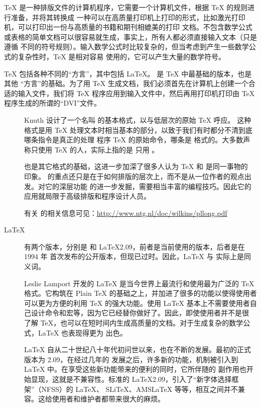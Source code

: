 \TeX{} 是一种排版文件的计算机程序，它需要一个计算机文件，根据 \TeX{} 的规则进行准备，并将其转换成
一种可以在高质量打印机上打印的形式，比如激光打印机，可以打印出一份与高质量的书籍和期刊相媲美的打印
文档。不包含数学公式或表格的简单文档可以很容易就生成，事实上，所有人都必须直接输入文本（只是遵循
不同的符号规则）。输入数学公式时比较复杂的，但当考虑到产生一些数学公式的复杂性时，\TeX{} 是相对容易
使用的，它可以产生大量的数学符号。

\TeX{} 包括各种不同的“方言”，其中包括 \LaTeX{}。\PlainTeX{} 是 \TeX{} 中最基础的版本，也是其他
“方言”的基础。为了用 \TeX{} 生成文档，我们必须首先在计算机上创建一个合适的输入文件，我们将 \TeX{}
程序应用到输入文件中，然后再用打印机打印由 \TeX{} 程序生成的所谓的“DVI”文件。

\begin{description}
  \item[\PlainTeX] Knuth 设计了一个名叫 \PlainTeX{} 的基本格式，以与低层次的原始 \TeX{} 呼应。
    这种格式是用 \TeX{} 处理文本时相当基本的部分，以致于我们有时都分不清到底哪条指令是真正的处理
    程序 \TeX{} 的原始命令，哪条是 \PlainTeX{} 格式的。大多数声称只使用 \TeX{} 的人，实际上指的是
    只用 \PlainTeX{}。

    \PlainTeX{} 也是其它格式的基础，这进一步加深了很多人认为 \TeX{} 和 \PlainTeX{} 是同一事物的
    印象。\PlainTeX{} 的重点还只是在于如何排版的层次上，而不是从一位作者的观点出发。对它的深层功能
    的进一步发掘，需要相当丰富的编程技巧。因此它的应用就局限于高级排版和程序设计人员。

    有关 \PlainTeX{} 的相关信息可见：\url{http://www.ntg.nl/doc/wilkins/pllong.pdf}

  \item[\LaTeX] 有两个版本，分别是 \LaTeXe{} 和 \LaTeX2.09，前者是当前使用的版本，后者是在 1994 年
    首次发布的公开版本，但现已过时。因此，\LaTeX{} 与 \LaTeXe{} 实际上是同义词。

    Leslie Lamport 开发的 \LaTeX{} 是当今世界上最流行和使用最为广泛的 \TeX{} 格式。它构筑在 Plain
    \TeX{} 的基础之上，并加进了很多的功能以使得使用者可以更为方便的利用 \TeX{} 的强大功能。使用
    \LaTeX{} 基本上不需要使用者自己设计命令和宏等，因为它已经替你做好了。因此，即使使用者并不是很
    了解 \TeX{}，也可以在短时间内生成高质量的文档。对于生成复杂的数学公式，\LaTeX{} 也表现得更为
    出色。

    \LaTeX{} 自从二十世纪八十年代初问世以来，也在不断的发展。最初的正式版本为 2.09，在经过几年的
    发展之后，许多新的功能，机制被引入到 \LaTeX{} 中。在享受这些新功能带来的便利的同时，它所伴随的
    副作用也开始显现，这就是不兼容性。标准的 \LaTeX2.09，引入了“新字体选择框架”（NFSS）的 \LaTeX{}、
    SLiTeX、AMSLaTeX 等等，相互之间并不兼容。这给使用者和维护者都带来很大的麻烦。


\end{description}
